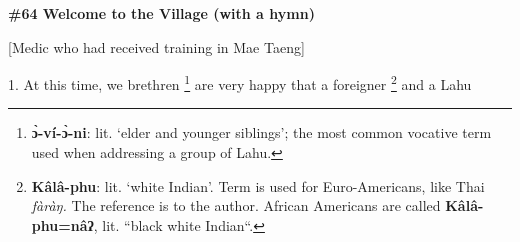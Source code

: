 
\textbf{\#64 Welcome to the Village (with a hymn)}

[Medic who had received training in Mae Taeng]

1. At this time, we brethren \footnote{\textbf{ɔ̀-ví-ɔ̀-ni}: lit. `elder and younger siblings'; the most common vocative term used when addressing a group of Lahu.} are very happy that a foreigner \footnote{\textbf{Kâlâ-phu}: lit. `white Indian'. Term is used for Euro-Americans, like Thai \textit{fàràŋ.} The reference is to the author. African Americans are called \textbf{Kâlâ-phu=nâʔ}, lit. ``black white Indian``.} and a Lahu
